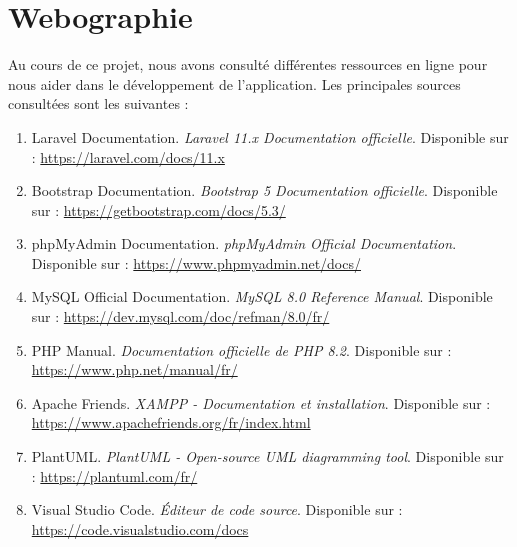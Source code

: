 \documentclass[12pt,a4paper]{report}
\begin{document}
\clearpage

\clearpage
{}
\chapter*{Webographie}

Au cours de ce projet, nous avons consulté différentes ressources en ligne pour nous aider dans le développement de l'application. Les principales sources consultées sont les suivantes :
\begin{enumerate}
    \item Laravel Documentation. \textit{Laravel 11.x Documentation officielle}. Disponible sur : \url{https://laravel.com/docs/11.x}
    \item Bootstrap Documentation. \textit{Bootstrap 5 Documentation officielle}. Disponible sur : \url{https://getbootstrap.com/docs/5.3/}
    \item phpMyAdmin Documentation. \textit{phpMyAdmin Official Documentation}. Disponible sur : \url{https://www.phpmyadmin.net/docs/}
    \item MySQL Official Documentation. \textit{MySQL 8.0 Reference Manual}. Disponible sur : \url{https://dev.mysql.com/doc/refman/8.0/fr/}
    \item PHP Manual. \textit{Documentation officielle de PHP 8.2}. Disponible sur : \url{https://www.php.net/manual/fr/}
    \item Apache Friends. \textit{XAMPP - Documentation et installation}. Disponible sur : \url{https://www.apachefriends.org/fr/index.html}
    \item PlantUML. \textit{PlantUML - Open-source UML diagramming tool}. Disponible sur : \url{https://plantuml.com/fr/}
    \item Visual Studio Code. \textit{Éditeur de code source}. Disponible sur : \url{https://code.visualstudio.com/docs}
\end{enumerate}

\clearpage
\end{document}
